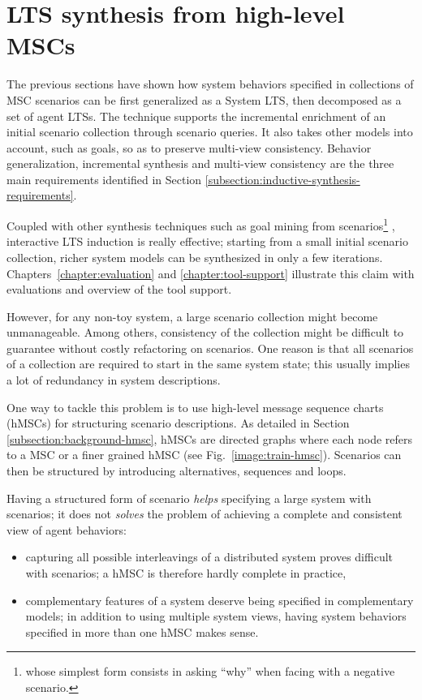 \section{LTS synthesis from high-level MSCs\label{section:inductive-from-hMSC}}

The previous sections have shown how system behaviors specified in collections of MSC scenarios can be first generalized as a System LTS, then decomposed as a set of agent LTSs. The technique supports the incremental enrichment of an initial scenario collection through scenario queries. It also takes other models into account, such as goals, so as to preserve multi-view consistency. Behavior generalization, incremental synthesis and multi-view consistency are the three main requirements identified in Section \ref{subsection:inductive-synthesis-requirements}. 

Coupled with other synthesis techniques such as goal mining from scenarios\footnote{whose simplest form consists in asking ``why'' when facing with a negative scenario.} \cite{Damas:2006}, interactive LTS induction is really effective; starting from a small initial scenario collection, richer system models can be synthesized in only a few iterations. Chapters~\ref{chapter:evaluation} and \ref{chapter:tool-support} illustrate this claim with evaluations and overview of the tool support.

However, for any non-toy system, a large scenario collection might become unmanageable. Among others, consistency of the collection might be difficult to guarantee without costly refactoring on scenarios. One reason is that all scenarios of a collection are required to start in the same system state; this usually implies a lot of redundancy in system descriptions.

One way to tackle this problem is to use high-level message sequence charts (hMSCs) for structuring scenario descriptions. As detailed in Section \ref{subsection:background-hmsc}, hMSCs are directed graphs where each node refers to a MSC or a finer grained hMSC (see Fig.~\ref{image:train-hmsc}). Scenarios can then be structured by introducing alternatives, sequences and loops.

Having a structured form of scenario \emph{helps} specifying a large system with scenarios; it does not \emph{solves} the problem of achieving a complete and consistent view of agent behaviors:
\begin{itemize}
\item capturing all possible interleavings of a distributed system proves difficult with scenarios; a hMSC is therefore hardly complete in practice,
\item complementary features of a system deserve being specified in complementary models; in addition to using multiple system views, having system behaviors specified in more than one hMSC makes sense.
\end{itemize}

